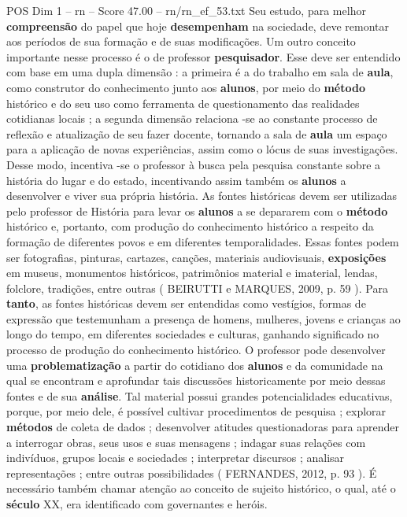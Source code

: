 \begin{textsample}{POS Dim 1 – rn – Score 47.00 – rn/rn\_ef\_53.txt}
Seu estudo, para melhor \textbf{compreensão} do papel que hoje \textbf{desempenham} na sociedade, deve remontar aos períodos de sua formação e de suas modificações.
Um outro conceito importante nesse processo é o de professor \textbf{pesquisador}.
Esse deve ser entendido com base em uma dupla dimensão : a primeira é a do trabalho em sala de \textbf{aula}, como construtor do conhecimento junto aos \textbf{alunos}, por meio do \textbf{método} histórico e do seu uso como ferramenta de questionamento das realidades cotidianas locais ; a segunda dimensão relaciona -se ao constante processo de reflexão e atualização de seu fazer docente, tornando a sala de \textbf{aula} um espaço para a aplicação de novas experiências, assim como o lócus de suas investigações.
Desse modo, incentiva -se o professor à busca pela pesquisa constante sobre a história do lugar e do estado, incentivando assim também os \textbf{alunos} a desenvolver e viver sua própria história.
As fontes históricas devem ser utilizadas pelo professor de História para levar os \textbf{alunos} a se depararem com o \textbf{método} histórico e, portanto, com produção do conhecimento histórico a respeito da formação de diferentes povos e em diferentes temporalidades.
Essas fontes podem ser fotografias, pinturas, cartazes, canções, materiais audiovisuais, \textbf{exposições} em museus, monumentos históricos, patrimônios material e imaterial, lendas, folclore, tradições, entre outras ( BEIRUTTI e MARQUES, 2009, p. 59 ).
Para \textbf{tanto}, as fontes históricas devem ser entendidas como vestígios, formas de expressão que testemunham a presença de homens, mulheres, jovens e crianças ao longo do tempo, em diferentes sociedades e culturas, ganhando significado no processo de produção do conhecimento histórico.
O professor pode desenvolver uma \textbf{problematização} a partir do cotidiano dos \textbf{alunos} e da comunidade na qual se encontram e aprofundar tais discussões historicamente por meio dessas fontes e de sua \textbf{análise}.
Tal material possui grandes potencialidades educativas, porque, por meio dele, é possível cultivar procedimentos de pesquisa ; explorar \textbf{métodos} de coleta de dados ; desenvolver atitudes questionadoras para aprender a interrogar obras, seus usos e suas mensagens ; indagar suas relações com indivíduos, grupos locais e sociedades ; interpretar discursos ; analisar representações ; entre outras possibilidades ( FERNANDES, 2012, p. 93 ).
É necessário também chamar atenção ao conceito de sujeito histórico, o qual, até o \textbf{século} XX, era identificado com governantes e heróis.

\end{textsample}

